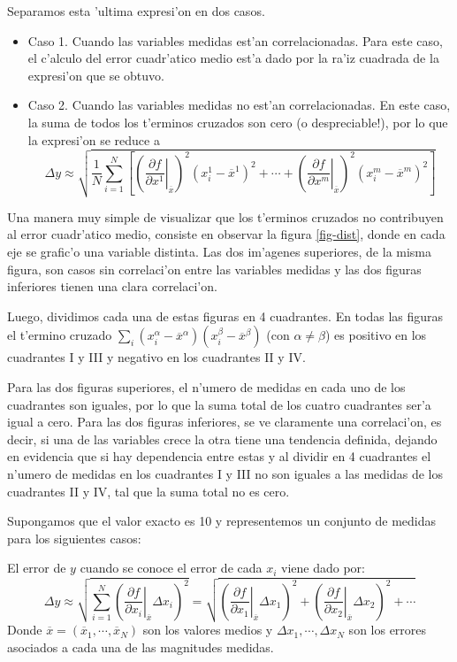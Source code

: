 \documentclass[a4paper]{report}
\begin{document}
Separamos esta 'ultima expresi'on en dos casos. 

\begin{itemize}
\item Caso 1. Cuando las variables medidas est'an correlacionadas.
Para este caso, el c'alculo del error cuadr'atico medio est'a dado por  la ra'iz cuadrada de la expresi'on que se obtuvo.

\item Caso 2. Cuando las variables medidas no est'an correlacionadas.
En este caso, la suma de todos los t'erminos cruzados son cero (o despreciable!), por lo que la expresi'on se reduce a
\begin{equation}
\Delta y\approx \sqrt{\frac{1}{N}\sum_{i=1}^N\left[\left(\left.\frac{\partial f}{\partial x^1}\right|_{\overline{x}}\right)^2 (x^1_i-\overline{x}^1)^2 +\cdots + \left(\left.\frac{\partial f}{\partial x^m}\right|_{\overline{x}}\right)^2(x^m_i-\overline{x}^m)^2\right]}
\end{equation}
\end{itemize}

Una manera muy simple de visualizar que los t'erminos cruzados no contribuyen al error cuadr'atico medio, consiste en observar la figura \ref{fig-dist}, donde en cada eje se grafic'o una variable distinta. Las dos im'agenes superiores, de la misma figura, son casos sin correlaci'on entre las variables medidas y las dos figuras inferiores tienen una clara correlaci'on.

Luego, dividimos cada una de estas figuras en 4 cuadrantes. En todas las figuras el t'ermino cruzado $\sum_i(x_i^\alpha-\overline{x}^\alpha)(x_i^\beta-\overline{x}^\beta)$ (con $\alpha\neq\beta$) es positivo en los cuadrantes I y III y negativo en los cuadrantes II y IV. 

Para las dos figuras superiores, el n'umero de medidas en cada uno de los cuadrantes son iguales, por lo que la suma total de los cuatro cuadrantes ser'a igual a cero. 
Para las dos figuras inferiores, se ve claramente una correlaci'on, es decir, si una de las variables crece la otra tiene una tendencia definida, dejando en evidencia que si hay dependencia entre estas y al dividir en 4 cuadrantes el n'umero de medidas en los cuadrantes I y III no son iguales a las medidas de los cuadrantes II y IV, tal que la suma total no es cero. 

Supongamos que el valor exacto es 10 y representemos un conjunto de medidas para los siguientes casos:

El error de $y$ cuando se conoce el error de cada $x_i$ viene dado por:
\begin{equation}\label{pe}
\Delta y\approx\sqrt{\sum_{i=1}^N\left(\left.\frac{\partial f}{\partial x_i}\right|_{\overline{x}}\Delta x_i\right)^2}
=\sqrt{\left(\left.\frac{\partial f}{\partial x_1}\right|_{\overline{x}}\Delta x_1\right)^2+\left(\left.\frac{\partial f}{\partial x_2}\right|_{\overline{x}}\Delta x_2\right)^2+\cdots}
\end{equation}
Donde $\overline{x}=(\overline{x}_1,\cdots,\overline{x}_N)$ son los valores medios y $\Delta{x_1},\cdots, \Delta{x_N}$ son los errores asociados a cada una de las magnitudes medidas.
\end{document}
